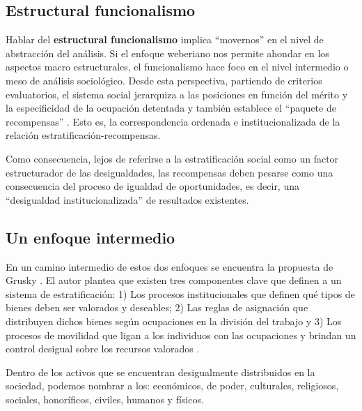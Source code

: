 \documentclass[
]{book}
\begin{document}
\hypertarget{estructural-funcionalismo}{%
\subsection{Estructural funcionalismo}\label{estructural-funcionalismo}}

Hablar del \textbf{estructural funcionalismo} implica ``movernos'' en el nivel de abstracción del análisis. Si el enfoque weberiano nos permite ahondar en los aspectos macro estructurales, el funcionalismo hace foco en el nivel intermedio o meso de análisis sociológico. Desde esta perspectiva, partiendo de criterios evaluatorios, el sistema social jerarquiza a las posiciones en función del mérito y la especificidad de la ocupación detentada y también establece el ``paquete de recompensas'' \citep{CachonRodriguez1989, Parsons1954}. Esto es, la correspondencia ordenada e institucionalizada de la relación estratificación-recompensas.

Como consecuencia, lejos de referirse a la estratificación social como un factor estructurador de las desigualdades, las recompensas deben pesarse como una consecuencia del proceso de igualdad de oportunidades, es decir, una ``desigualdad institucionalizada'' de resultados existentes.

\hypertarget{un-enfoque-intermedio}{%
\subsection{Un enfoque intermedio}\label{un-enfoque-intermedio}}

En un camino intermedio de estos dos enfoques se encuentra la propuesta de Grusky \citeyearpar{Grusky2008}. El autor plantea que existen tres componentes clave que definen a un sistema de estratificación: 1) Los procesos institucionales que definen qué tipos de bienes deben ser valorados y deseables; 2) Las reglas de asignación que distribuyen dichos bienes según ocupaciones en la división del trabajo y 3) Los procesos de movilidad que ligan a los individuos con las ocupaciones y brindan un control desigual sobre los recursos valorados \citep[pp.~5]{Grusky2008}.

Dentro de los activos que se encuentran desigualmente distribuidos en la sociedad, podemos nombrar a los: económicos, de poder, culturales, religiosos, sociales, honoríficos, civiles, humanos y físicos.
\end{document}
